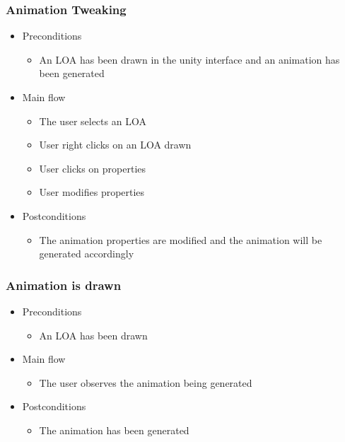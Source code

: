\subsubsection{Animation Tweaking}
    \begin{itemize}
    \item Preconditions
        \begin{itemize}
            \item An LOA has been drawn in the unity interface and an animation has been generated
        \end{itemize}
    \end{itemize}
    \begin{itemize}
        \item Main flow
        \begin{itemize}
            \item The user selects an LOA
            \item User right clicks on an LOA drawn
            \item User clicks on properties
            \item User modifies properties
        \end{itemize}
    \end{itemize}
    \begin{itemize}
        \item Postconditions
        \begin{itemize}
            \item The animation properties are modified and the animation will be generated accordingly
        \end{itemize}
    \end{itemize}

\subsubsection{Animation is drawn}
    \begin{itemize}
    \item Preconditions
        \begin{itemize}
            \item An LOA has been drawn
        \end{itemize}
    \end{itemize}
    \begin{itemize}
        \item Main flow
        \begin{itemize}
            \item The user observes the animation being generated
        \end{itemize}
    \end{itemize}
    \begin{itemize}
        \item Postconditions
        \begin{itemize}
            \item The animation has been generated
        \end{itemize}
    \end{itemize}
